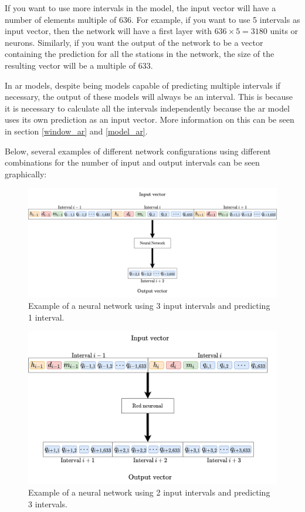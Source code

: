 If you want to use more intervals in the model, the input vector will have a number of elements multiple of $636$. For example, if you want to use 5 intervals as input vector, then the network will have a first layer with $636 \times 5 = 3180$ units or neurons. Similarly, if you want the output of the network to be a vector containing the prediction for all the stations in the network, the size of the resulting vector will be a multiple of $633$.
\newline


In \acrfull{ar} models, despite being models capable of predicting multiple intervals if necessary, the output of these models will always be an interval. This is because it is necessary to calculate all the intervals independently because the \acrshort{ar} model uses its own prediction as an input vector. More information on this can be seen in section \ref{window_ar} and \ref{model_ar}.
\newline

Below, several examples of different network configurations using different combinations for the number of input and output intervals can be seen graphically:

\begin{figure}[H]
    \centering
    \includegraphics[width=14cm]{images/solution/preprocessing/models-design-1.png}
    \caption{Example of a neural network using 3 input intervals and predicting 1 interval.}
    \label{fig:models-design-1}
\end{figure}

\begin{figure}[H]
    \centering
    \includegraphics[width=14cm]{images/solution/preprocessing/models-design-2.png}
    \caption{Example of a neural network using 2 input intervals and predicting 3 intervals.}
        \label{fig:models-design-2}
\end{figure}



